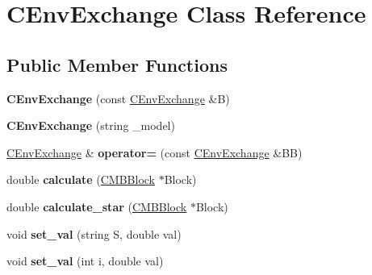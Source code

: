 \hypertarget{class_c_env_exchange}{}\section{C\+Env\+Exchange Class Reference}
\label{class_c_env_exchange}
\subsection*{Public Member Functions}
\begin{DoxyCompactItemize}
\item 
\mbox{\label{class_c_env_exchange_acd16bb56947ceeac1667fff219a1c2da}} 
{\bfseries C\+Env\+Exchange} (const \hyperlink{class_c_env_exchange}{C\+Env\+Exchange} \&B)
\item 
\mbox{\label{class_c_env_exchange_af3b75a86b847a57adbaceafe35828ec9}} 
{\bfseries C\+Env\+Exchange} (string \+\_\+model)
\item 
\mbox{\label{class_c_env_exchange_a0b6e28320ce9dbce89f3248de8161a2c}} 
\hyperlink{class_c_env_exchange}{C\+Env\+Exchange} \& {\bfseries operator=} (const \hyperlink{class_c_env_exchange}{C\+Env\+Exchange} \&BB)
\item 
\mbox{\label{class_c_env_exchange_a8a1bbf7203f41030999743ddd12cd9c7}} 
double {\bfseries calculate} (\hyperlink{class_c_m_b_block}{C\+M\+B\+Block} $\ast$Block)
\item 
\mbox{\label{class_c_env_exchange_a8dd8c4fee2529611ee4b6282e206016e}} 
double {\bfseries calculate\+\_\+star} (\hyperlink{class_c_m_b_block}{C\+M\+B\+Block} $\ast$Block)
\item 
\mbox{\label{class_c_env_exchange_aaf3b7244cb8fc3f49f430819d45280ef}} 
void {\bfseries set\+\_\+val} (string S, double val)
\item 
\mbox{\label{class_c_env_exchange_a2df9aa6214c05737b27e82b8fe439488}} 
void {\bfseries set\+\_\+val} (int i, double val)
\end{DoxyCompactItemize}
